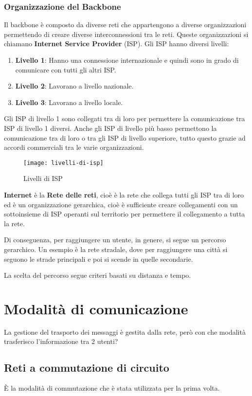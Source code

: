 \documentclass[a4paper]{article}
\begin{document}
\subsubsection{Organizzazione del Backbone}
Il backbone è composto da diverse reti che appartengono a diverse organizzazioni
permettendo di creare diverse interconnessioni tra le reti. Queste organizzazioni
si chiamano \textbf{Internet Service Provider} (ISP). Gli ISP hanno diversi livelli:
\begin{enumerate}
  \item \textbf{Livello 1}: Hanno una connessione internazionale
    e quindi sono in grado di comunicare con tutti gli altri ISP.
  \item \textbf{Livello 2}: Lavorano a livello nazionale.
  \item \textbf{Livello 3}: Lavorano a livello locale.
\end{enumerate}

\noindent
Gli ISP di livello 1 sono collegati tra di loro per permettere la comunicazione
tra ISP di livello 1 diversi. Anche gli ISP di livello più basso permettono
la comunicazione tra di loro o tra gli ISP di livello superiore, tutto questo
grazie ad accordi commerciali tra le varie organizzazioni.
\begin{figure}[H]
  \centering
  \texttt{[image: livelli-di-isp]}
  \caption{Livelli di ISP}
\end{figure}

\noindent
\textbf{Internet} è la \textbf{Rete delle reti}, cioè è la rete che collega
tutti gli ISP tra di loro ed è un organizzazione gerarchica, cioè è sufficiente
creare collegamenti con un sottoinsieme di ISP operanti sul territorio per permettere
il collegamento a tutta la rete.

\noindent
Di conseguenza, per raggiungere un utente, in genere, si segue un percorso gerarchico.
Un esempio è la rete stradale, dove per raggiungere una città si seguono le strade
principali e poi si scende in quelle secondarie.

\noindent
La scelta del percorso segue criteri basati su distanza e tempo.

\section{Modalità di comunicazione}
La gestione del trasporto dei messaggi è gestita dalla rete, però con che modalità
trasferisco l'informazione tra 2 utenti?

\subsection{Reti a commutazione di circuito}
È la modalità di commutazione che è stata utilizzata per la prima volta.
\end{document}
